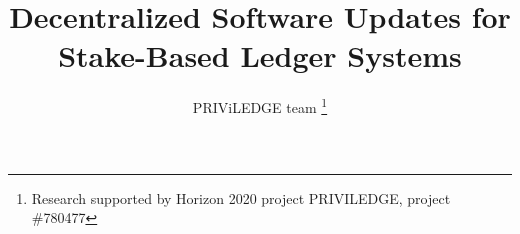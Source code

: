 \title{Decentralized Software Updates for Stake-Based Ledger Systems}
\author{PRIViLEDGE team
        \fnmsep \thanks{Research supported by Horizon 2020 project PRIVILEDGE, project \#780477}}
\maketitle
